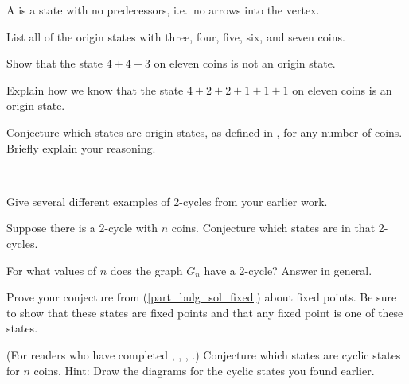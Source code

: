 \begin{exer}[\exerU] %
\label{exer_bulg_sol_origin_examples} 
    A  is a state with no predecessors, i.e.\ no arrows into the vertex.
        \begin{exerpart}
            \item List all of the origin states with three, four, five, six, and seven coins.
            \item Show that the state $4+4+3$ on eleven coins is not an origin state.
            \item Explain how we know that the state $4+2+2+1+1+1$ on eleven coins is an origin state. 
        \end{exerpart}    
\end{exer}

\begin{exer}[\exerE] %
\label{exer_bulg_sol_origin_conj} 
    Conjecture which states are origin states, as defined in , for any number of coins.  Briefly explain your reasoning.
\end{exer}

\begin{exer}[\exerE] %
\label{exer_bulg_sol_2cycles}
~
    \begin{exerpart}
        \item Give several different examples of 2-cycles from your earlier work.   
        \item Suppose there is a 2-cycle with $n$ coins.  Conjecture which states are in that 2-cycles.  
        \item For what values of $n$ does the graph $G_n$ have a 2-cycle?  Answer in general.
    \end{exerpart}
\end{exer}

\begin{exer}[\exerE] %
\label{exer_bulg_sol_fixed_points_proof}
    Prove your conjecture from  (\ref{part_bulg_sol_fixed}) about fixed points.  Be sure to show that these states are fixed points and that any fixed point is one of these states.
\end{exer}

\begin{exer}[\exerE] %
\label{exer_bulg_sol_cyclic states}
    (For readers who have completed , , , .)
    Conjecture which states are cyclic states for $n$ coins.  Hint:  Draw the diagrams for the cyclic states you found earlier.
\end{exer}

